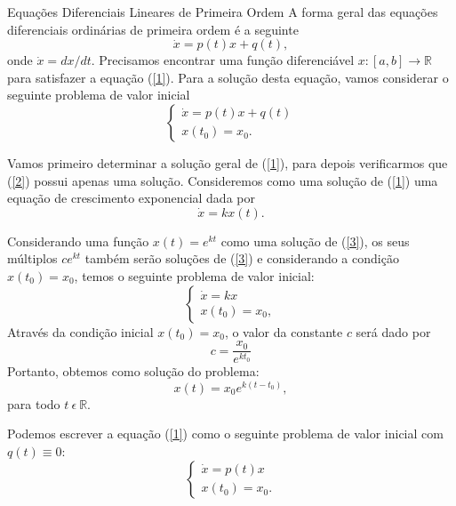 \documentclass[blue]{beamer}
\numberwithin{equation}{section}
\begin{document}
\begin{frame}{Equações Diferenciais Lineares de Primeira Ordem}
	\justifying
\hspace{0.2cm} A forma geral das equações diferenciais ordinárias de primeira ordem é a seguinte
\begin{equation} \label{1}
\dot{x}=p(t)x+q(t),
\end{equation}
onde $\dot{x} = dx/dt$. Precisamos encontrar uma função diferenciável $x: [a,b] \rightarrow \mathbb{R}$ para satisfazer a equação (\ref{1}). Para a solução desta equação, vamos considerar o seguinte problema de valor inicial
\begin{equation} \label{2}
\left\lbrace
\begin{array}{lcl} 
\dot{x} = p(t)x + q(t)\\
x(t_{0})= x_{0}.
\end{array}
\right.
\end{equation}

\hspace{0.2cm} Vamos primeiro determinar a solução geral de (\ref{1}), para depois verificarmos que (\ref{2}) possui apenas uma solução. Consideremos como uma solução de (\ref{1}) uma equação de crescimento exponencial dada por
\begin{equation} \label{3}
\dot{x}=kx(t).
\end{equation}

\end{frame}

\begin{frame}
	\justifying
\hspace{0.2cm} Considerando uma função $x(t)=e^{kt}$ como uma solução de (\ref{3}), os seus múltiplos $ce^{kt}$ também serão soluções de (\ref{3}) e considerando a condição $x(t_{0})=x_{0}$, temos o seguinte problema de valor inicial:
$$\left\lbrace
\begin{array}{lcl}
\dot{x}=kx \\
x(t_{0})=x_{0},
\end{array}
\right.$$
\hspace{0.2cm} Através da condição inicial $x(t_{0})=x_{0}$, o valor da constante $c$ será dado por
$$c=\dfrac{x_{0}}{e^{kt_{0}}}$$
Portanto, obtemos como solução do problema:
$$x(t)=x_{0} e^{k(t-t_{0})},$$
para todo $t \ \epsilon \ \mathbb{R}$.

\hspace{0.2cm} Podemos escrever a equação (\ref{1}) como o seguinte problema de valor inicial com $q(t)\equiv 0$:
\begin{equation} \label{4}
\left\lbrace
\begin{array}{lcl}
\dot{x}= p(t)x \\
x(t_{0})=x_{0}.
\end{array}
\right.
\end{equation}

\end{frame}
\end{document}
